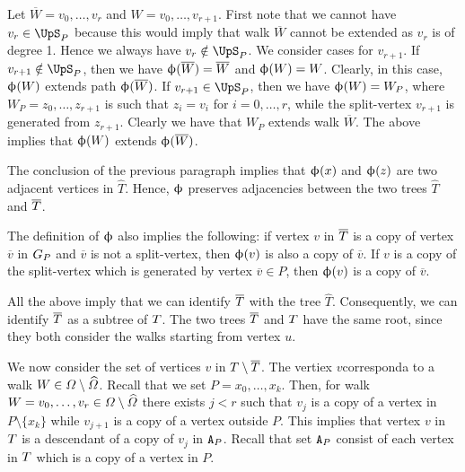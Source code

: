 \documentclass[11pt,reqno]{amsart}
\numberwithin{equation}{section}
\newcommand{\blue}[1]{{\color{blue}#1}}
\newcommand{\bluepigment}[1]{{\color{blue(pigment)}#1}}
\newcommand{\bostonuniversityred}[1]{{\color{bostonuniversityred}#1}}
\newcommand{\capri}[1]{{\color{capri}#1}}
\newcommand{\cadmiumgreen}[1]{{\color{cadmiumgreen}#1}}
\newcommand{\coquelicot}[1]{{\color{coquelicot}#1}}
\newcommand{\electricviolet}[1]{{\color{electricviolet}#1}}
\newcommand{\goldenbrown}[1]{{\color{goldenbrown}#1}}
\newcommand{\heliotrope}[1]{{\color{heliotrope}#1}}
\newcommand{\red}[1]{{\color{red}#1}}
\renewcommand{\blue}[1]{#1}
\renewcommand{\bluepigment}[1]{#1}
\renewcommand{\bostonuniversityred}[1]{#1}
\renewcommand{\capri}[1]{#1}
\renewcommand{\cadmiumgreen}[1]{#1}
\renewcommand{\coquelicot}[1]{#1}
\renewcommand{\electricviolet}[1]{#1}
\renewcommand{\goldenbrown}[1]{#1}
\renewcommand{\heliotrope}[1]{#1}
\renewcommand{\red}[1]{#1}
\newcommand{\ki}{\capri{i}}
\newcommand{\kj}{\coquelicot{j}}
\newcommand{\kk}{\bluepigment{k}}
\newcommand{\kP}{\goldenbrown{P}}
\newcommand{\kr}{\bostonuniversityred{r}}%
\newcommand{\ku}{\red{u}}
\newcommand{\kv}{\electricviolet{v}}
\newcommand{\kW}{\blue{W}}
\newcommand{\kx}{\heliotrope{x}}
\newcommand{\kz}{\cadmiumgreen{z}}
\renewcommand{\ki}{i}
\renewcommand{\kj}{j}
\renewcommand{\kk}{k}
\renewcommand{\kP}{P}
\renewcommand{\kr}{r}
\renewcommand{\ku}{u}
\renewcommand{\kv}{v}
\renewcommand{\kW}{W}
\renewcommand{\kx}{x}
\renewcommand{\kz}{z}
\begin{document}
Let $\overline{\kW}=\kv_0, \ldots, \kv_{\kr}$ and $\kW=\kv_0, \ldots, \kv_{\kr+1}$. First note that  we cannot  have 
$\kv_{\kr}\in \ssplit_{\kP}$ because this would imply that walk $\overline{\kW}$ cannot be extended as $\kv_{\kr}$  is of 
degree 1. Hence we always have  $\kv_{\kr}\notin \ssplit_{\kP}$. We consider cases for $\kv_{\kr+1}$. If 
$\kv_{\kr+1}\notin \ssplit_{\kP}$, then we have  $\BBijection(\overline{\kW})=\overline{\kW}$ and 
 $\BBijection(\kW)=\kW$.
Clearly,  in this case, $\BBijection(\kW)$ extends path  $\BBijection(\overline{\kW})$.  If $ \kv_{\kr+1}\in \ssplit_{\kP}$, 
then  we have $\BBijection(\kW)=\kW_{\kP}$, where  $\kW_{\kP}=\kz_0, \ldots, \kz_{\kr+1}$ 
is such that  $\kz_{\ki}=\kv_{\ki}$ for $\ki=0, \ldots, \kr$,  while the split-vertex $\kv_{\kr+1}$ is generated from 
$\kz_{\kr+1}$.  Clearly we have that  $\kW_{\kP}$   extends walk $\overline{\kW}$.  The above implies that 
$\BBijection(\kW)$  extends $\BBijection(\overline{\kW})$.  



The conclusion of the previous paragraph implies that   $\BBijection(\kx)$ and $\BBijection(\kz)$ are  two adjacent 
vertices in $\widehat{T}$.   Hence,   $\upphi$ preserves adjacencies between the two trees $\widehat{T}$ and 
$\SMTPu$.




The definition of $\upphi$ also implies the following:  if vertex $\kv$ in $\SMTPu$ is a copy of vertex $\overline{\kv}$ in 
$\gext{G}{\kP}$ and $\overline{\kv}$ is not a split-vertex, then  $\BBijection(\kv)$ is also a copy of $\overline{\kv}$. If $\kv$ is a copy 
of the split-vertex  which is generated by vertex $\overline{\kv} \in \kP$, then  $\BBijection(\kv)$ is a copy of $\overline{\kv}$. 



All the above imply that we can identify $\SMTPu$ with the tree $\widehat{T}$. Consequently, we can identify 
$\SMTPu$ as a subtree of $T$. The two trees $\SMTPu$ and $T$ have the same root, since they both 
consider the walks  starting from vertex $\ku$. 






We now consider the set of vertices $\kv$ in $\SMTu\setminus \SMTPu$. 
%
The vertiex $\kv $corresponda to a walk  $\kW\in \sawpaths\setminus \widehat{\sawpaths}$. 
%
Recall that we set $\kP=\kx_0, \ldots, \kx_{\kk}$.  Then, for   walk $\kW=\kv_0, \ldots, \kv_{\kr}\in \sawpaths\setminus \widehat{\sawpaths}$
 there exists  $\kj<\kr$ such that $\kv_{\kj}$ is a  copy of a vertex in $\kP \setminus\{ \kx_{\kk}\}$ while $\kv_{j+1}$ is a copy of a vertex 
outside $\kP$.  This implies that  vertex $\kv$ in $T$ is a descendant of a copy of $\kv_{\kj}$ in   $\cpT$.  Recall
that set $\cpT$ consist of each vertex in $T$ which is a copy of a vertex in $\kP$. 
\end{document}
